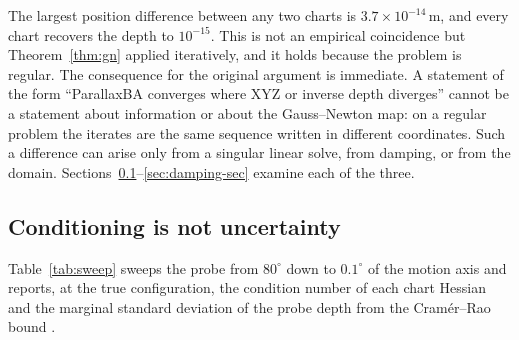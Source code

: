 \documentclass[11pt,a4paper]{article}
\let\cite\citep
\theoremstyle{definition}
\theoremstyle{remark}
\begin{document}
The largest position difference between any two charts is $3.7\times10^{-14}$\,m, and every chart recovers the depth to $10^{-15}$. This is not an empirical coincidence but Theorem~\ref{thm:gn} applied iteratively, and it holds because the problem is regular. The consequence for the original argument is immediate. A statement of the form ``ParallaxBA converges where XYZ or inverse depth diverges'' cannot be a statement about information or about the Gauss--Newton map: on a regular problem the iterates are the same sequence written in different coordinates. Such a difference can arise only from a singular linear solve, from damping, or from the domain. Sections~\ref{sec:sweep}--\ref{sec:damping-sec} examine each of the three.

\subsection{Conditioning is not uncertainty}
\label{sec:sweep}
Table~\ref{tab:sweep} sweeps the probe from $80^\circ$ down to $0.1^\circ$ of the motion axis and reports, at the true configuration, the condition number of each chart Hessian and the marginal standard deviation of the probe depth from the Cram\'er--Rao bound \cite{kay1993estimation}.
\end{document}

